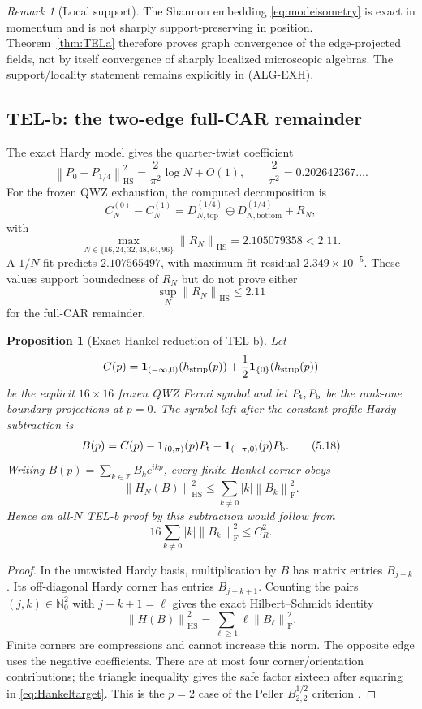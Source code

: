 \documentclass[11pt]{article}
\newtheorem{proposition}[theorem]{Proposition}
\theoremstyle{remark}
\newtheorem{remark}[theorem]{Remark}
\newcommand{\Z}{\mathbb Z}
\newcommand{\id}{\mathbf 1}
\newcommand{\HS}{\mathrm{HS}}
\newcommand{\norm}[1]{\left\lVert#1\right\rVert}
\begin{document}
\begin{remark}[Local support]
The Shannon embedding \eqref{eq:modeisometry} is exact in momentum and
is not sharply support-preserving in position.  Theorem~\ref{thm:TELa}
therefore proves graph convergence of the edge-projected fields, not by
itself convergence of sharply localized microscopic algebras.  The
support/locality statement remains explicitly in \textup{(ALG-EXH)}.
\end{remark}

\subsection{TEL-b: the two-edge full-CAR remainder}

The exact Hardy model gives the quarter-twist coefficient
\[
 \norm{P_0-P_{1/4}}_{\HS}^2
 =\frac{2}{\pi^2}\log N+O(1),
\qquad \frac2{\pi^2}=0.202642367\ldots .
\tag{5.14}\label{eq:hardylog}
\]
For the frozen QWZ exhaustion, the computed decomposition is
\[
 C_N^{(0)}-C_N^{(1)}
 =D_{N,\mathrm{top}}^{(1/4)}
  \oplus D_{N,\mathrm{bottom}}^{(1/4)}+R_N,
\tag{5.15}\label{eq:tworemainder}
\]
with
\[
 \max_{N\in\{16,24,32,48,64,96\}}\norm{R_N}_{\HS}
 =2.105079358<2.11.
\tag{5.16}\label{eq:measured211}
\]
A $1/N$ fit predicts $2.107565497$, with maximum fit residual
$2.349\times10^{-5}$.  These values support boundedness of $R_N$ but do
not prove either
\[
 \sup_N\norm{R_N}_{\HS}\le2.11
\tag{5.17}\label{eq:allN211}
\]
for the full-CAR remainder.

\begin{proposition}[Exact Hankel reduction of TEL-b]
\label{prop:HankelReduction}
Let
\[
 C(p)=\id_{(-\infty,0)}(h_{\rm strip}(p))
       +\frac12\id_{\{0\}}(h_{\rm strip}(p))
\]
be the explicit $16\times16$ frozen QWZ Fermi symbol and let
$P_{\rm t},P_{\rm b}$ be the rank-one boundary projections at $p=0$.
The symbol left after the constant-profile Hardy subtraction is
\[
 B(p)=C(p)
 -\id_{(0,\pi)}(p)P_{\rm t}
 -\id_{(-\pi,0)}(p)P_{\rm b}.
\tag{5.18}\label{eq:regularizedsymbol}
\]
Writing $B(p)=\sum_{k\in\Z}B_ke^{ikp}$, every finite Hankel corner
obeys
\[
 \norm{H_N(B)}_{\HS}^2
 \le\sum_{k\ne0}|k|\norm{B_k}_{\mathrm F}^2.
\tag{5.19}\label{eq:PellerHS}
\]
Hence an all-$N$ TEL-b proof by this subtraction would follow from
\[
 16\sum_{k\ne0}|k|\norm{B_k}_{\mathrm F}^2\le C_R^2.
\tag{5.20}\label{eq:Hankeltarget}
\]
\end{proposition}

\begin{proof}
In the untwisted Hardy basis, multiplication by $B$ has matrix entries
$B_{j-k}$.  Its off-diagonal Hardy corner has entries $B_{j+k+1}$.
Counting the pairs $(j,k)\in\mathbb N_0^2$ with $j+k+1=\ell$ gives the exact
Hilbert--Schmidt identity
\[
 \norm{H(B)}_{\HS}^2
 =\sum_{\ell\ge1}\ell\norm{B_\ell}_{\mathrm F}^2.
\]
Finite corners are compressions and cannot increase this norm.  The
opposite edge uses the negative coefficients.  There are at most four
corner/orientation contributions; the triangle inequality gives the
safe factor sixteen after squaring in \eqref{eq:Hankeltarget}.  This is
the $p=2$ case of the Peller $B^{1/2}_{2,2}$ criterion \cite{Peller}.
\end{proof}
\end{document}
